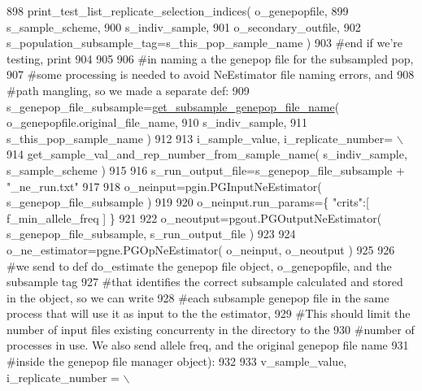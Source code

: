 \begin{DoxyCode}
898                 print\_test\_list\_replicate\_selection\_indices( o\_genepopfile, 
899                                         s\_sample\_scheme,    
900                                         s\_indiv\_sample, 
901                                         o\_secondary\_outfile, 
902                                         s\_population\_subsample\_tag=s\_this\_pop\_sample\_name )
903             \textcolor{comment}{#end if we're testing, print }
904             
905 
906             \textcolor{comment}{#in naming a the genepop file for the subsampled pop,}
907             \textcolor{comment}{#some processing is needed to avoid NeEstimator file naming errors, and}
908             \textcolor{comment}{#path mangling, so we made a separate def:}
909             s\_genepop\_file\_subsample=\hyperlink{namespacenegui_1_1pgdriveneestimator_a84955fc339f0354149185b5fa6444340}{get\_subsample\_genepop\_file\_name}( 
      o\_genepopfile.original\_file\_name, 
910                                                     s\_indiv\_sample, 
911                                                     s\_this\_pop\_sample\_name )
912 
913             i\_sample\_value, i\_replicate\_number= \(\backslash\)
914                         get\_sample\_val\_and\_rep\_number\_from\_sample\_name( s\_indiv\_sample, s\_sample\_scheme )
915 
916             s\_run\_output\_file=s\_genepop\_file\_subsample + \textcolor{stringliteral}{"\_ne\_run.txt"}
917 
918             o\_neinput=pgin.PGInputNeEstimator( s\_genepop\_file\_subsample )
919 
920             o\_neinput.run\_params=\{ \textcolor{stringliteral}{"crits"}:[ f\_min\_allele\_freq ]  \}
921 
922             o\_neoutput=pgout.PGOutputNeEstimator( s\_genepop\_file\_subsample, s\_run\_output\_file ) 
923 
924             o\_ne\_estimator=pgne.PGOpNeEstimator( o\_neinput, o\_neoutput ) 
925 
926             \textcolor{comment}{#we send to def do\_estimate the genepop file object, o\_genepopfile, and the subsample tag}
927             \textcolor{comment}{#that identifies the correct subsample calculated and stored in the object, so we can write}
928             \textcolor{comment}{#each subsample genepop file in the same process that will use it as input to the the
       estimator, }
929             \textcolor{comment}{#This should limit the number of input files existing concurrenty in the directory to the }
930             \textcolor{comment}{#number of processes in use.  We also send allele freq, and the original genepop file name }
931             \textcolor{comment}{#inside the genepop file manager object):}
932 
933             v\_sample\_value, i\_replicate\_number = \(\backslash\)

\end{DoxyCode}
